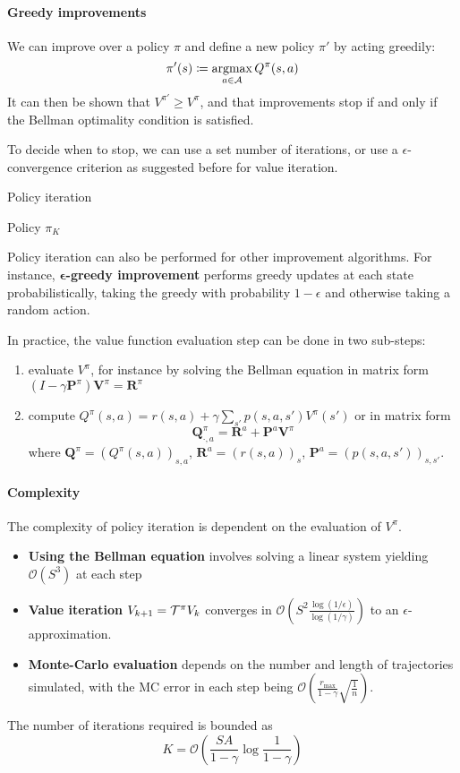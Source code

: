 \documentclass[../course-notes.tex]{subfiles}
\begin{document}
\paragraph{Greedy improvements} We can improve over a policy $\pi$ and define a new policy $\pi'$ by acting greedily:
\[
	\pi'(s) \coloneqq \operatorname*{\mathrm{argmax}}_{a\in\mathcal{A}} Q^\pi(s,a)
\]
It can then be shown that $V^{\pi'} \geq V^{\pi}$, and that improvements stop if and only if the Bellman optimality condition is satisfied.

To decide when to stop, we can use a set number of iterations, or use a $\epsilon$-convergence criterion as suggested before for value iteration.

\begin{algorithm}\label{algo:PolicyIteration}
	\caption{Policy iteration}
	\Return Policy $\pi_K$\;
\end{algorithm}


Policy iteration can also be performed for other improvement algorithms. For instance, \textbf{$\boldsymbol\epsilon$-greedy improvement} performs greedy updates at each state probabilistically, taking the greedy with probability $1-\epsilon$ and otherwise taking a random action.


In practice, the value function evaluation step can be done in two sub-steps:
\begin{enumerate}
	\item evaluate $V^\pi$, for instance by solving the Bellman equation in matrix form $(I-\gamma\mathbf{P}^\pi)\mathbf{V}^\pi = \mathbf{R}^\pi$
	\item compute $Q^\pi(s,a) = r(s,a) + \gamma \sum_{s'} p(s,a,s')V^\pi(s')$ or in matrix form
	\[
		\mathbf{Q}^\pi_{\cdot, a} = \mathbf{R}^a + \mathbf{P}^a \mathbf{V}^\pi
	\]
	where $\mathbf{Q}^\pi = (Q^\pi(s,a))_{s,a}$, $\mathbf{R}^a = (r(s,a))_s$, $\mathbf{P}^a = (p(s,a,s'))_{s,s'}$.
\end{enumerate}

\paragraph{Complexity} The complexity of policy iteration is dependent on the evaluation of $V^\pi$.
\begin{itemize}
	\item \textbf{Using the Bellman equation} involves solving a linear system yielding $\mathcal O(S^3)$ at each step
	\item \textbf{Value iteration} $V_{k+1} = \mathcal{T}^\pi V_k$ converges in $\mathcal{O}\left(S^2\frac{\log(1/\epsilon)}{\log(1/\gamma)}\right)$ to an $\epsilon$-approximation.
	\item \textbf{Monte-Carlo evaluation} depends on the number and length of trajectories simulated, with the MC error in each step being $\mathcal{O}\left(\frac{r_{\max}}{1-\gamma}\sqrt{\frac{1}{n}}\right)$.
\end{itemize}
The number of iterations required is bounded as
\[
	K = \mathcal{O}\left(
	\frac{SA}{1-\gamma}\log\frac{1}{1-\gamma}
	\right)
\]
\end{document}
